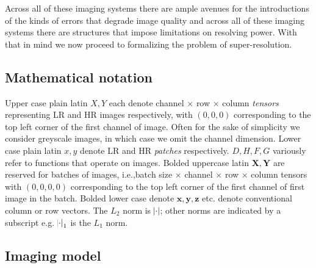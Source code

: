 Across all of these imaging systems there are ample avenues for the introductions of the kinds of errors that degrade image quality and across all of these imaging systems there are structures that impose limitations on resolving power.
%
With that in mind we now proceed to formalizing the problem of super-resolution.

\subsection{Mathematical notation}\label{subsec:notation}
Upper case plain latin \(X, Y\) each denote channel \(\times\) row \(\times\) column \textit{tensors} representing LR and HR images respectively, with \((0, 0,0)\) corresponding to the top left corner of the first channel of image.
%
Often for the sake of simplicity we consider greyscale images, in which case we omit the channel dimension.
%
Lower case plain latin \(x, y\) denote LR and HR \textit{patches} respectively.
%
\(D, H, F, G\) variously refer to functions that operate on images.
%
Bolded uppercase latin \(\bm{X}, \bm{Y}\) are reserved for batches of images, i.e.,batch size \(\times\) channel \(\times\) row \(\times\) column tensors with \((0, 0, 0,0)\) corresponding to the top left corner of the first channel of first image in the batch.
%
Bolded lower case denote \(\bm{x}, \bm{y}, \bm{z}\) etc. denote conventional column or row vectors.
%
The \(L_2\) norm is \(\abs{\cdot}\); other norms are indicated by a subscript e.g. \(\abs{\cdot}_1\) is the \(L_1\) norm.

\subsection{Imaging model}\label{subsec:imaging-model}

